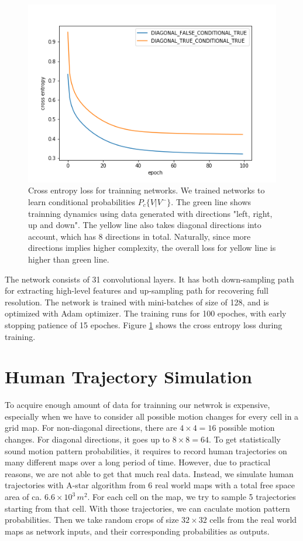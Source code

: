 \begin{figure}[ht]
  \centering
   \captionsetup{width=\linewidth}
    \includegraphics[width=.7\textwidth]{figures/trainning_history.png}
    \caption{Cross entropy loss for trainning networks. We trained networks to learn conditional probabilities \( P_c\{V | V^-\} \). The green line shows trainning dynamics using data generated with directions "left, right, up and down". The yellow line also takes diagonal directions into account, which has 8 directions in total. Naturally, since more directions implies higher complexity, the overall loss for yellow line is higher than green line.}
    \label{fig:trainning}
\end{figure}

The network consists of 31 convolutional layers. It has both down-sampling path for extracting high-level features and up-sampling path for recovering full resolution. The network is trained with mini-batches of size of 128, and  is optimized with Adam optimizer. The training runs for 100 epoches, with early stopping patience of 15 epoches. Figure \ref{fig:trainning} shows the cross entropy loss during training.

\section{Human Trajectory Simulation} \label{section:hms}

To acquire enough amount of data for trainning our netwrok is expensive, especially when we have to consider all possible motion changes for every cell in a grid map. For non-diagonal directions, there are \( 4\times4=16\) possible motion changes. For diagonal directions, it goes up to \( 8\times8=64\). To get statistically sound motion pattern probabilities, it requires to record human trajectories on many different maps over a long period of time. However, due to practical reasons, we are not able to get that much real data. Instead, we simulate human trajectories with A-star algorithm from 6 real world maps with a total free space area of ca. \( 6.6\times10^3 \, m^2 \). For each cell on the map, we try to sample 5 trajectories starting from that cell. With those trajectories, we can caculate motion pattern probabilities. Then we take random crops of size \( 32 \times 32 \) cells from the real world maps as network inputs, and their corresponding probabilities as outputs. 

